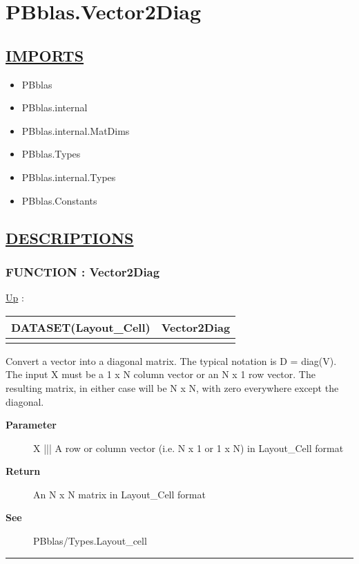 \chapter*{PBblas.Vector2Diag}
\hypertarget{ecldoc:toc:PBblas.Vector2Diag}{}

\section*{\underline{IMPORTS}}
\begin{itemize}
\item PBblas
\item PBblas.internal
\item PBblas.internal.MatDims
\item PBblas.Types
\item PBblas.internal.Types
\item PBblas.Constants
\end{itemize}

\section*{\underline{DESCRIPTIONS}}
\subsection*{FUNCTION : Vector2Diag}
\hypertarget{ecldoc:pbblas.vector2diag}{}
\hyperlink{ecldoc:toc:PBblas}{Up} :

{\renewcommand{\arraystretch}{1.5}
\begin{tabularx}{\textwidth}{|>{\raggedright\arraybackslash}l|X|}
\hline
\hspace{0pt}DATASET(Layout\_Cell) & Vector2Diag \\
\hline
\multicolumn{2}{|>{\raggedright\arraybackslash}X|}{\hspace{0pt}(DATASET(Layout\_Cell) X)} \\
\hline
\end{tabularx}
}

\par
Convert a vector into a diagonal matrix. The typical notation is D = diag(V). The input X must be a 1 x N column vector or an N x 1 row vector. The resulting matrix, in either case will be N x N, with zero everywhere except the diagonal.

\par
\begin{description}
\item [\textbf{Parameter}] X ||| A row or column vector (i.e. N x 1 or 1 x N) in Layout\_Cell format
\item [\textbf{Return}] An N x N matrix in Layout\_Cell format
\item [\textbf{See}] PBblas/Types.Layout\_cell
\end{description}

\rule{\linewidth}{0.5pt}
